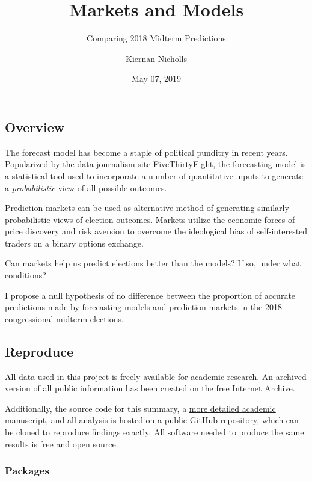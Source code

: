 \documentclass[]{article}
\title{Markets and Models}
\subtitle{Comparing 2018 Midterm Predictions}
\author{Kiernan Nicholls}
\date{May 07, 2019}
\begin{document}
\maketitle

{
\setcounter{tocdepth}{2}
\tableofcontents
}
\hypertarget{overview}{%
\subsection{Overview}\label{overview}}

The forecast model has become a staple of political punditry in recent
years. Popularized by the data journalism site
\href{https://fivethirtyeight.com/}{FiveThirtyEight}, the forecasting
model is a statistical tool used to incorporate a number of quantitative
inputs to generate a \emph{probabilistic} view of all possible outcomes.

Prediction markets can be used as alternative method of generating
similarly probabilistic views of election outcomes. Markets utilize the
economic forces of price discovery and risk aversion to overcome the
ideological bias of self-interested traders on a binary options
exchange.

Can markets help us predict elections better than the models? If so,
under what conditions?

I propose a null hypothesis of no difference between the proportion of
accurate predictions made by forecasting models and prediction markets
in the 2018 congressional midterm elections.

\hypertarget{reproduce}{%
\subsection{Reproduce}\label{reproduce}}

All data used in this project is freely available for academic research.
An archived version of all public information has been created on the
free Internet Archive.

Additionally, the source code for this summary, a
\href{https://github.com/kiernann/predictr/blob/master/docs/paper/paper.pdf}{more
detailed academic manuscript}, and
\href{https://github.com/kiernann/predictr/tree/master/code}{all
analysis} is hosted on a
\href{https://github.com/kiernann/predictr}{public GitHub repository},
which can be cloned to reproduce findings exactly. All software needed
to produce the same results is free and open source.

\hypertarget{packages}{%
\subsubsection{Packages}\label{packages}}
\end{document}
